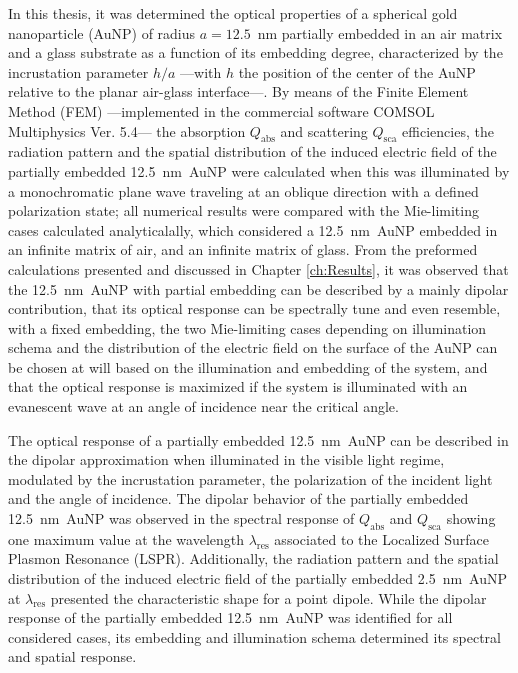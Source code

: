 
In this thesis, it was determined the  optical properties of a spherical gold nanoparticle (AuNP) of radius $a = 12.5$~nm partially embedded in an air matrix and a glass substrate  as a function of its embedding degree, characterized by the incrustation parameter $h/a$ ---with $h$ the position of the center of the AuNP relative to the planar air-glass interface---. By means of the Finite Element Method (FEM) ---implemented in the commercial software COMSOL Multiphysics\texttrademark{} Ver. 5.4--- the absorption $Q_\text{abs}$ and scattering $Q_\text{sca}$ efficiencies, the radiation pattern and the spatial distribution of the induced electric field of the partially embedded 12.5~nm~AuNP were calculated when this was illuminated by a monochromatic plane wave traveling at an oblique direction with a defined polarization state; all numerical results were compared with the Mie-limiting cases calculated analyticalally, which considered a 12.5~nm~AuNP embedded in an infinite matrix of air, and an infinite matrix of glass. From the preformed calculations presented  and discussed in  Chapter \ref{ch:Results}, it was observed that the 12.5~nm~AuNP with partial embedding can be described by a mainly dipolar contribution, that its optical response can be spectrally tune and even resemble, with a fixed embedding, the two Mie-limiting cases depending on illumination schema and the distribution of the electric field  on the surface of the AuNP can be chosen at will based on the illumination and embedding of the system, and that the optical response is maximized if the system is illuminated with an evanescent wave at an angle of incidence near the critical angle.

The optical response of a partially embedded 12.5~nm~AuNP can be described in the dipolar approximation when illuminated in the visible light regime, modulated by the incrustation parameter, the polarization of the incident light and the angle of incidence. The dipolar behavior of the partially embedded 12.5~nm~AuNP was observed in the spectral response of  $Q_\text{abs}$ and  $Q_\text{sca}$  showing one maximum value at the wavelength $\lambda_\text{res}$ associated to the Localized Surface Plasmon Resonance (LSPR). Additionally,  the radiation pattern and the spatial distribution of the induced electric field of the partially embedded  2.5~nm~AuNP at  $\lambda_\text{res}$ presented the characteristic shape for a point dipole. While the dipolar response of the  partially embedded 12.5~nm~AuNP was identified for all considered cases, its embedding and illumination schema determined its spectral and spatial response.

